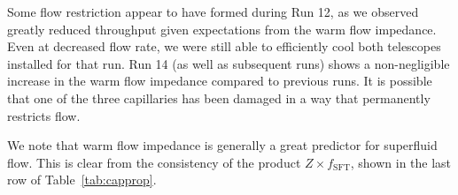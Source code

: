 \documentclass[
12pt, %
letterpaper, %
oneside, %
headinclude, footinclude, %
BCOR5mm, %
]{scrartcl}
\newcommand{\mrm}[1]{\mathrm{#1}}
\begin{document}
Some flow restriction appear to have formed during Run 12, as we observed greatly reduced throughput given expectations from the warm flow impedance. Even at decreased flow rate, we were still able to efficiently cool both telescopes installed for that run. Run 14 (as well as subsequent runs) shows a non-negligible increase in the warm flow impedance compared to previous runs. It is possible that one of the three capillaries has been damaged in a way that permanently restricts flow.


We note that warm flow impedance is generally a great predictor for superfluid flow. This is clear from the consistency of the product $ Z \times f_\mrm{SFT}$, shown in the last row of Table~\ref{tab:capprop}.
\end{document}
